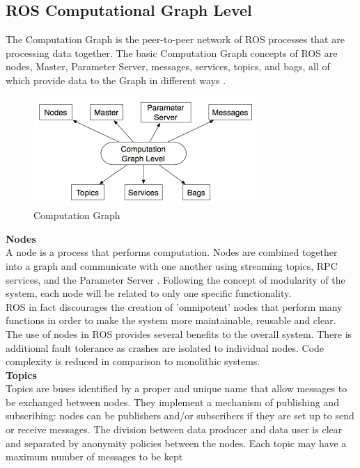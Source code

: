 \newpage

\subsection{ROS Computational Graph Level}
The Computation Graph is the peer-to-peer network of ROS processes that are processing data together. The basic Computation Graph concepts of ROS are nodes, Master, Parameter Server, messages, services, topics, and bags, all of which provide data to the Graph in different ways \citet{rosconcepts}.\\
\begin{figure}[H]
    \centering
    \includegraphics{Images/Chapter 2/computationgraph.png}
    \caption{Computation Graph}
    \label{fig:computationgraph}
\end{figure}
\textbf{Nodes}\\
A node is a process that performs computation. Nodes are combined together into a graph and communicate with one another using streaming topics, RPC services, and the Parameter Server \citet{rosnodes}. Following the concept of modularity of the system, each node will be related to only one specific functionality.\\ ROS in fact
discourages the creation of 'omnipotent' nodes that perform many functions in order to make the system more maintainable, reusable and clear.\\
The use of nodes in ROS provides several benefits to the overall system. There is additional fault tolerance as crashes are isolated to individual nodes. Code complexity is reduced in comparison to monolithic systems.\\
\newpage
\textbf{Topics}\\
Topics are buses identified by a proper and unique name that allow messages to be exchanged between nodes. They implement a mechanism
of publishing and subscribing: nodes can be publishers and/or subscribers if they are set up to send or receive messages. The division between
data producer and data user is clear and separated by anonymity policies
between the nodes. Each topic may have a maximum number of messages to be kept
